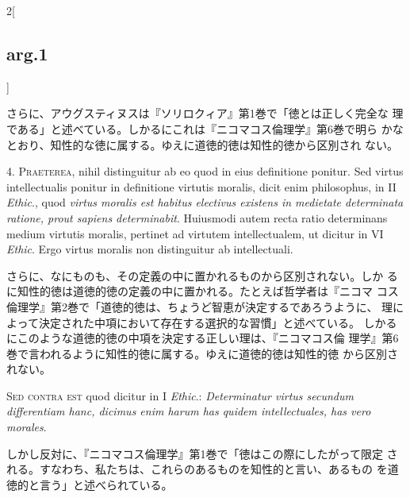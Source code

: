\documentclass[paper=a4paper,fontsize=10pt,jafontsize=9pt,titlepage]{jlreq}
\begin{document}
\begin{paracol}{2}[\subsection{arg.1}]
\switchcolumn

さらに、アウグスティヌスは『ソリロクィア』第1巻で「徳とは正しく完全な
 理である」と述べている。しかるにこれは『ニコマコス倫理学』第6巻で明ら
 かなとおり、知性的な徳に属する。ゆえに道徳的徳は知性的徳から区別され
 ない。


4. {\scshape Praeterea}, nihil distinguitur ab eo quod in eius
definitione ponitur. Sed virtus intellectualis ponitur in definitione
virtutis moralis, dicit enim philosophus, in II {\itshape Ethic}.,
quod {\itshape virtus moralis est habitus electivus existens in
medietate determinata ratione, prout sapiens determinabit}. Huiusmodi
autem recta ratio determinans medium virtutis moralis, pertinet ad
virtutem intellectualem, ut dicitur in VI {\itshape Ethic}. Ergo
virtus moralis non distinguitur ab intellectuali.

\switchcolumn

さらに、なにものも、その定義の中に置かれるものから区別されない。しか
 るに知性的徳は道徳的徳の定義の中に置かれる。たとえば哲学者は『ニコマ
 コス倫理学』第2巻で「道徳的徳は、ちょうど智恵が決定するであろうように、
 理によって決定された中項において存在する選択的な習慣」と述べている。
 しかるにこのような道徳的徳の中項を決定する正しい理は、『ニコマコス倫
 理学』第6巻で言われるように知性的徳に属する。ゆえに道徳的徳は知性的徳
 から区別されない。

\switchcolumn*[\subsection{s.c.}]

{\scshape Sed contra est} quod dicitur in I {\itshape Ethic}.:
{\itshape Determinatur virtus secundum differentiam hanc, dicimus enim
harum has quidem intellectuales, has vero morales}.

\switchcolumn

しかし反対に、『ニコマコス倫理学』第1巻で「徳はこの際にしたがって限定
 される。すなわち、私たちは、これらのあるものを知性的と言い、あるもの
 を道徳的と言う」と述べられている。



\end{paracol}
\end{document}
